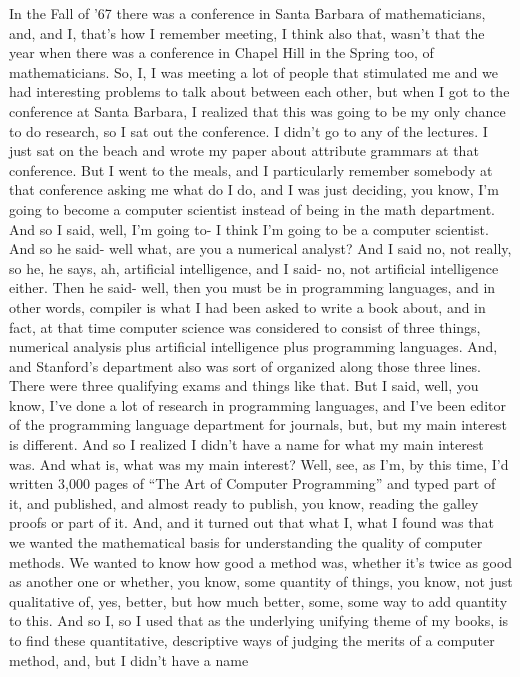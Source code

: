 \documentclass[]{article}
\begin{document}
In the Fall of '67 there was a conference in Santa Barbara of
mathematicians, and, and I, that's how I remember meeting, I think also
that, wasn't that the year when there was a conference in Chapel Hill in
the Spring too, of mathematicians. So, I, I was meeting a lot of people
that stimulated me and we had interesting problems to talk about between
each other, but when I got to the conference at Santa Barbara, I
realized that this was going to be my only chance to do research, so I
sat out the conference. I didn't go to any of the lectures. I just sat
on the beach and wrote my paper about attribute grammars at that
conference. But I went to the meals, and I particularly remember
somebody at that conference asking me what do I do, and I was just
deciding, you know, I'm going to become a computer scientist instead of
being in the math department. And so I said, well, I'm going to- I think
I'm going to be a computer scientist. And so he said- well what, are you
a numerical analyst? And I said no, not really, so he, he says, ah,
artificial intelligence, and I said- no, not artificial intelligence
either. Then he said- well, then you must be in programming languages,
and in other words, compiler is what I had been asked to write a book
about, and in fact, at that time computer science was considered to
consist of three things, numerical analysis plus artificial intelligence
plus programming languages. And, and Stanford's department also was sort
of organized along those three lines. There were three qualifying exams
and things like that. But I said, well, you know, I've done a lot of
research in programming languages, and I've been editor of the
programming language department for journals, but, but my main interest
is different. And so I realized I didn't have a name for what my main
interest was. And what is, what was my main interest? Well, see, as I'm,
by this time, I'd written 3,000 pages of ``The Art of Computer
Programming'' and typed part of it, and published, and almost ready to
publish, you know, reading the galley proofs or part of it. And, and it
turned out that what I, what I found was that we wanted the mathematical
basis for understanding the quality of computer methods. We wanted to
know how good a method was, whether it's twice as good as another one or
whether, you know, some quantity of things, you know, not just
qualitative of, yes, better, but how much better, some, some way to add
quantity to this. And so I, so I used that as the underlying unifying
theme of my books, is to find these quantitative, descriptive ways of
judging the merits of a computer method, and, but I didn't have a name
\end{document}
